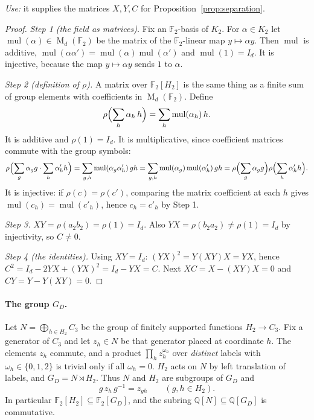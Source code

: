 \documentclass[11pt]{article}
\theoremstyle{remark}
\numberwithin{equation}{section}
\newcommand{\F}{\mathbb F}
\newcommand{\Q}{\mathbb Q}
\newcommand{\Mat}{\operatorname{M}}
\newcommand{\mul}{\operatorname{mul}}
\begin{document}
\emph{Use:} it supplies the matrices $X,Y,C$ for Proposition~\ref{prop:separation}.

\begin{proof}
\emph{Step 1 (the field as matrices).} Fix an $\F_2$-basis of $K_2$. For $\alpha\in K_2$ let $\mul(\alpha)\in\Mat_d(\F_2)$ be the matrix of the $\F_2$-linear map $y\mapsto\alpha y$. Then $\mul$ is additive, $\mul(\alpha\alpha')=\mul(\alpha)\mul(\alpha')$ and $\mul(1)=I_d$. It is injective, because the map $y\mapsto\alpha y$ sends $1$ to $\alpha$.

\emph{Step 2 (definition of $\rho$).} A matrix over $\F_2[H_2]$ is the same thing as a finite sum of group elements with coefficients in $\Mat_d(\F_2)$. Define
\[
 \rho\Bigl(\sum_h\alpha_h\,h\Bigr)=\sum_h\mul(\alpha_h)\,h .
\]
It is additive and $\rho(1)=I_d$. It is multiplicative, since coefficient matrices commute with the group symbols:
\[
 \rho\Bigl(\sum_g\alpha_gg\cdot\sum_h\alpha'_hh\Bigr)
 =\sum_{g,h}\mul(\alpha_g\alpha'_h)\,gh
 =\sum_{g,h}\mul(\alpha_g)\mul(\alpha'_h)\,gh
 =\rho\Bigl(\sum_g\alpha_gg\Bigr)\rho\Bigl(\sum_h\alpha'_hh\Bigr).
\]
It is injective: if $\rho(c)=\rho(c')$, comparing the matrix coefficient at each $h$ gives $\mul(c_h)=\mul(c'_h)$, hence $c_h=c'_h$ by Step 1.

\emph{Step 3.} $XY=\rho(a_2b_2)=\rho(1)=I_d$. Also $YX=\rho(b_2a_2)\ne\rho(1)=I_d$ by injectivity, so $C\ne0$.

\emph{Step 4 (the identities).} Using $XY=I_d$: $(YX)^2=Y(XY)X=YX$, hence $C^2=I_d-2YX+(YX)^2=I_d-YX=C$. Next $XC=X-(XY)X=0$ and $CY=Y-Y(XY)=0$.
\end{proof}

\paragraph{The group $G_D$.} Let $N=\bigoplus_{h\in H_2}C_3$ be the group of finitely supported functions $H_2\to C_3$. Fix a generator of $C_3$ and let $z_h\in N$ be that generator placed at coordinate $h$. The elements $z_h$ commute, and a product $\prod_hz_h^{\omega_h}$ over \emph{distinct} labels with $\omega_h\in\{0,1,2\}$ is trivial only if all $\omega_h=0$. $H_2$ acts on $N$ by left translation of labels, and $G_D=N\rtimes H_2$. Thus $N$ and $H_2$ are subgroups of $G_D$ and
\begin{equation}\label{eq:conj}
 g\,z_h\,g^{-1}=z_{gh}\qquad(g,h\in H_2).
\end{equation}
In particular $\F_2[H_2]\subseteq\F_2[G_D]$, and the subring $\Q[N]\subseteq\Q[G_D]$ is commutative.
\end{document}
